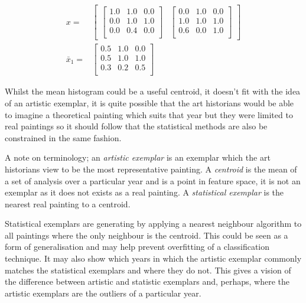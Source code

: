 \begin{align}
x=&\begin{bmatrix}
\begin{bmatrix}
1.0 & 1.0 & 0.0 \\
0.0 & 1.0 & 1.0 \\
0.0 & 0.4 & 0.0 \\
\end{bmatrix} & 
\begin{bmatrix}
0.0 & 1.0 & 0.0 \\
1.0 & 1.0 & 1.0 \\
0.6 & 0.0 & 1.0 \\
\end{bmatrix}
\end{bmatrix} \nonumber \\
\bar{x}_1 =& 
\begin{bmatrix}
0.5 & 1.0 & 0.0 \\
0.5 & 1.0 & 1.0 \\
0.3 & 0.2 & 0.5 \\
\end{bmatrix}
\label{eq:mean-matricies}
\end{align}

Whilst the mean histogram could be a useful centroid, it doesn't fit with the idea of an artistic 
exemplar, it is quite possible that the art historians would be able to imagine a theoretical
painting which suits that year but they were limited to real paintings so it should follow that
the statistical methods are also be constrained in the same fashion.

A note on terminology; an \emph{artistic exemplar} is an exemplar which the art historians view
to be the most representative painting. A \emph{centroid} is the mean of a set of analysis over a
particular year and is a point in feature space, it is not an exemplar as it does not exists as a 
real painting. A \emph{statistical exemplar} is the nearest real painting to a centroid.

Statistical exemplars are generating by applying a nearest neighbour algorithm to all paintings
where the only neighbour is the centroid. This could be seen as a form of generalisation and may
help prevent overfitting of a classification technique. It may also show which years in which
the artistic exemplar commonly matches the statistical exemplars and where they do not. This gives
a vision of the difference between artistic and statistic exemplars and, perhaps, where the 
artistic exemplars are the outliers of a particular year.

